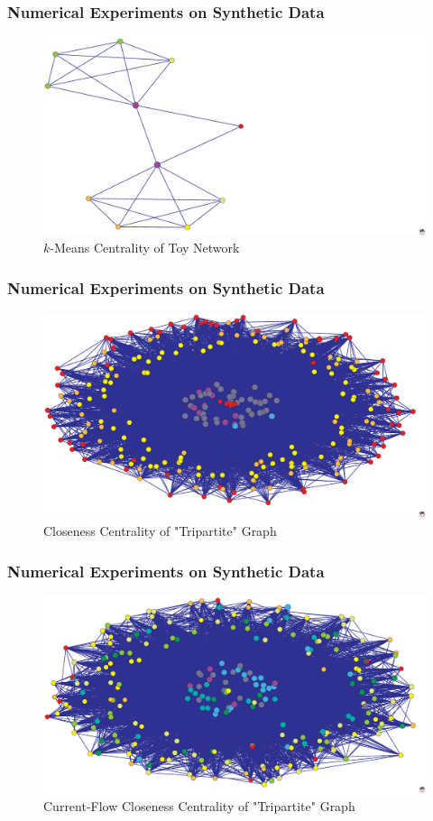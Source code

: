 \documentclass{beamer}
\begin{document}
\begin{frame}
\frametitle{Numerical Experiments on Synthetic Data}
\begin{figure}[h]
\begin{center}
\includegraphics[width=0.76\columnwidth]{toy_k_centrality}
\end{center}
\caption{$k$-Means Centrality of Toy Network}
\label{fig:K-Centrality - Toy}
\end{figure}
\end{frame}


\begin{frame}
\frametitle{Numerical Experiments on Synthetic Data}
\begin{figure}[h]
\begin{center}
\includegraphics[width=0.76\columnwidth]{toy2_closeness2}
\end{center}
\caption{Closeness Centrality of "Tripartite" Graph}
\label{fig:Closeness Centrality - Toy2}
\end{figure}
\end{frame}

\begin{frame}
\frametitle{Numerical Experiments on Synthetic Data}
\begin{figure}[h]
\begin{center}
\includegraphics[width=0.76\columnwidth]{toy2_current_flow_closeness}
\end{center}
\caption{Current-Flow Closeness Centrality of "Tripartite" Graph}
\label{fig:Current Flow Closeness Centrality - Toy2}
\end{figure}
\end{frame}
\end{document}
